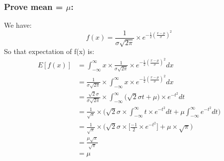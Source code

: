 \documentclass{article}
\begin{document}
\begin{itemize}
            \subsubsection{Prove mean = $\mu$:}
            We have: 
                \[
                        f(x) = \frac{1}{\sigma\sqrt{2\pi}}\times e^{ -\frac{1}{2}(\frac{x - \mu}{\sigma})^2} 
                \]
            So that expectation of f(x) is:
                \begin{equation}
                    \begin{split}
                        E[f(x)] & = \int_{-\infty}^{\infty} x \times \frac{1}{\sigma\sqrt{2\pi}}\times e^{ -\frac{1}{2}(\frac{x - \mu}{\sigma})^2}dx \\
                                & = \frac{1}{\sigma\sqrt{2\pi}} \times \int_{-\infty}^{\infty} x  \times e^{ -\frac{1}{2}(\frac{x - \mu}{\sigma})^2}dx \\
                                & = \frac{\sqrt{2}\sigma}{\sigma\sqrt{2\pi}} \times \int_{-\infty}^{\infty} \Big(\sqrt{2} \sigma t + \mu\Big) \times e^{-t^2}dt \\ 
                                & = \frac{1}{\sqrt{\pi}} \times \Bigg(\sqrt{2} \sigma \times
                                \int_{-\infty}^{\infty}  t \times e^{-t^2} dt + \mu \int_{-\infty}^{\infty} e^{-t^2}dt\Bigg) \\ 
                                & = \frac{1}{\sqrt{\pi}} \times \Bigg(\sqrt{2} \sigma \times
                                \Bigg[\frac{-1}{2} \times e^{-t^2}\Bigg] + \mu \times \sqrt{\pi}\Bigg)\\
                                & = \frac{\mu \sqrt{\pi}}{\sqrt{\pi}}\\
                                & = \mu
                    \end{split}
                \end{equation}

\end{itemize}
\end{document}
